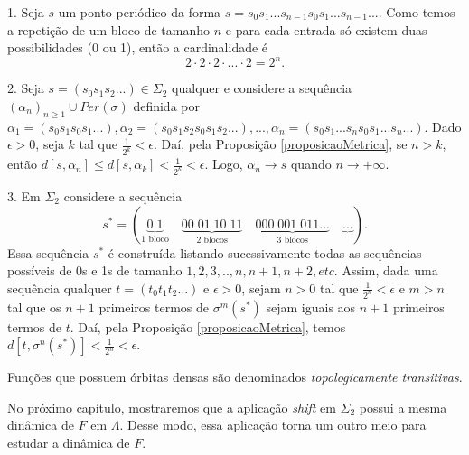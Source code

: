 \documentclass[../IC.tex]{subfiles}
\begin{document}
	\begin{prova}
		
		1. Seja $s$ um ponto periódico da forma $s = s_0s_1...s_{n-1}s_0s_1...s_{n-1}...$. Como temos a repetição de um bloco de tamanho $n$ e para cada entrada só existem duas possibilidades (0 ou 1), então a cardinalidade é 
		$$2\cdot2\cdot2\cdot...\cdot2=2^n.$$
		
		2.  Seja $s=(s_0s_1s_2...) \in \Sigma_2$ qualquer e considere a sequência $(\alpha_n)_{n\geq1} \cup Per(\sigma)$ definida por $\alpha_1=(s_0s_1s_0s_1...), \alpha_2=(s_0s_1s_2s_0s_1s_2...), ..., \alpha_n=(s_0s_1...s_ns_0s_1...s_n...)$. Dado $\epsilon>0$, seja $k$ tal que $\frac{1}{2^k}<\epsilon$. Daí, pela Proposição \ref{proposicaoMetrica}, se $n>k$, então $d[s, \alpha_n]\leq d[s, \alpha_k]<\frac{1}{2^k}<\epsilon$. Logo, $\alpha_n \to s$ quando $n \to +\infty$.
		
		3. Em $\Sigma_2$ considere a sequência
		$$s^* = (\underbrace{0 \; 1}_{\text{1 bloco}} \quad \underbrace{00 \; 01 \; 10 \; 11}_{\text{2 blocos}} \quad \underbrace{000 \; 001 \; 011...}_{\text{3 blocos}} \quad \underbrace{...}_{...}).$$
		Essa sequência $s^*$ é construída listando sucessivamente todas as sequências possíveis de 0s e 1s de tamanho $1,2,3,..,n,n+1,n+2, etc$.
		Assim, dada uma sequência qualquer $t=(t_0t_1t_2...)$ e $\epsilon>0$, sejam $n>0$ tal que $\frac{1}{2^n}<\epsilon$ e $m>n$ tal que os $n+1$ primeiros termos de $\sigma^m(s^*)$ sejam iguais aos $n+1$ primeiros termos de $t$. Daí, pela Proposição \ref{proposicaoMetrica}, temos $d[t, \sigma^n(s^*)]<\frac{1}{2^n} < \epsilon$.
	\end{prova}
	
	Funções que possuem órbitas densas são denominados \textit{topologicamente transitivas}.
	
	No próximo capítulo, mostraremos que a aplicação \textit{shift} em $\Sigma_2$ possui a mesma dinâmica de $F$ em $\Lambda$. Desse modo, essa aplicação torna um outro meio para estudar a dinâmica de $F$.
\end{document}
